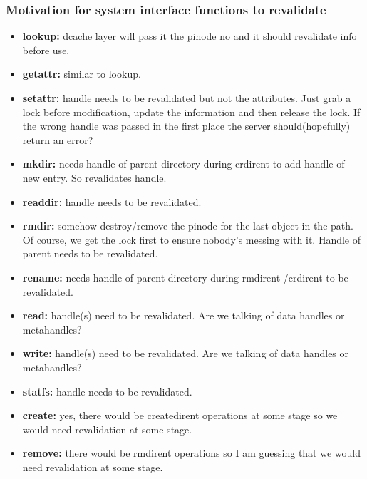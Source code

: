 \documentclass[11pt, letterpaper]{article}
\begin{document}
\subsubsection{Motivation for system interface functions to revalidate}
\begin{itemize}
\item \textbf{lookup:} dcache layer will pass it the pinode no and it should
revalidate info before use.\\ 
\item \textbf{getattr:} similar to lookup.\\
\item \textbf{setattr:} handle needs to be revalidated but not the 
attributes. Just grab a lock before modification, update the information
and then release the lock. If the wrong handle was passed in the first 
place the server should(hopefully) return an error?\\
\item \textbf{mkdir:} needs handle of parent directory during crdirent to
add handle of new entry. So revalidates handle.\\
\item \textbf{readdir:} handle needs to be revalidated. \\
\item \textbf{rmdir:} somehow destroy/remove the pinode for the last object
in the path. Of course, we get the lock first to ensure nobody's messing
with it. Handle of parent needs to be revalidated.\\ 
\item \textbf{rename:} needs handle of parent directory during rmdirent
/crdirent to be revalidated.\\
\item \textbf{read:} handle(s) need to be revalidated. Are we talking of data handles
or metahandles?\\
\item \textbf{write:} handle(s) need to be revalidated. Are we talking of
data handles or metahandles?\\
\item \textbf{statfs:} handle needs to be revalidated.\\
\item \textbf{create:} yes, there would be createdirent operations at some
stage so we would need revalidation at some stage.\\
\item \textbf{remove:} there would be rmdirent operations so I am guessing
that we would need revalidation at some stage.\\

\end{itemize}
\end{document}
